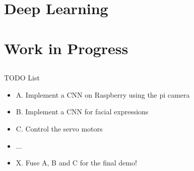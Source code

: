 \documentclass[compress]{beamer}
\begin{document}
\section{Deep Learning}

\subsection{}


\subsection{}


\subsection{}




\section{Work in Progress}


\subsection{}
{
\begin{frame}{TODO List}


          \begin{itemize}
              \item A. Implement a CNN on Raspberry using the pi camera
              \item B. Implement a CNN for facial expressions
              \item C. Control the servo motors
              \item ...
              \item X. Fuse A, B and C for the final demo!
          \end{itemize}

\end{frame}
}
\end{document}
